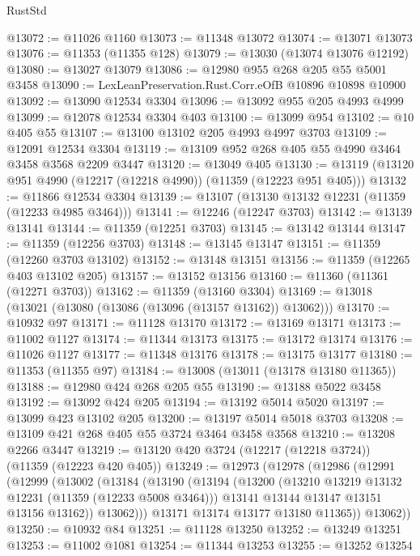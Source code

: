 \begin{lexlean}{RustStd}
\begin{coremodule}
{{{{{{{{{{{{{{{{{{{@13072 := @11026 @1160
@13073 := @11348 @13072
@13074 := @13071 @13073
@13076 := @11353 (@11355 @128)
@13079 := @13030 (@13074 @13076 @12192)
@13080 := @13027 @13079
@13086 := @12980 @955 @268 @205 @55 @5001 @3458
@13090 := LexLeanPreservation.Rust.Corr.eOfB @10896 @10898 @10900
@13092 := @13090 @12534 @3304
@13096 := @13092 @955 @205 @4993 @4999
@13099 := @12078 @12534 @3304 @403
@13100 := @13099 @954
@13102 := @10 @405 @55
@13107 := @13100 @13102 @205 @4993 @4997 @3703
@13109 := @12091 @12534 @3304
@13119 := @13109 @952 @268 @405 @55 @4990 @3464 @3458 @3568 @2209 @3447
@13120 := @13049 @405
@13130 := @13119 (@13120 @951 @4990 (@12217 (@12218 @4990)) (@11359 (@12223 @951 @405)))
@13132 := @11866 @12534 @3304
@13139 := @13107 (@13130 @13132 @12231 (@11359 (@12233 @4985 @3464)))
@13141 := @12246 (@12247 @3703)
@13142 := @13139 @13141
@13144 := @11359 (@12251 @3703)
@13145 := @13142 @13144
@13147 := @11359 (@12256 @3703)
@13148 := @13145 @13147
@13151 := @11359 (@12260 @3703 @13102)
@13152 := @13148 @13151
@13156 := @11359 (@12265 @403 @13102 @205)
@13157 := @13152 @13156
@13160 := @11360 (@11361 (@12271 @3703))
@13162 := @11359 (@13160 @3304)
@13169 := @13018 (@13021 (@13080 (@13086 (@13096 (@13157 @13162)) @13062)))
@13170 := @10932 @97
@13171 := @11128 @13170
@13172 := @13169 @13171
@13173 := @11002 @1127
@13174 := @11344 @13173
@13175 := @13172 @13174
@13176 := @11026 @1127
@13177 := @11348 @13176
@13178 := @13175 @13177
@13180 := @11353 (@11355 @97)
@13184 := @13008 (@13011 (@13178 @13180 @11365))
@13188 := @12980 @424 @268 @205 @55
@13190 := @13188 @5022 @3458
@13192 := @13092 @424 @205
@13194 := @13192 @5014 @5020
@13197 := @13099 @423 @13102 @205
@13200 := @13197 @5014 @5018 @3703
@13208 := @13109 @421 @268 @405 @55 @3724 @3464 @3458 @3568
@13210 := @13208 @2266 @3447
@13219 := @13120 @420 @3724 (@12217 (@12218 @3724)) (@11359 (@12223 @420 @405))
@13249 := @12973
    (@12978
      (@12986
        (@12991
          (@12999
            (@13002
              (@13184
                (@13190
                  (@13194
                    (@13200
                      (@13210 @13219 @13132 @12231 (@11359 (@12233 @5008 @3464)))
                      @13141
                      @13144
                      @13147
                      @13151
                      @13156
                      @13162))
                  @13062)))
            @13171
            @13174
            @13177
            @13180
            @11365))
        @13062))
@13250 := @10932 @84
@13251 := @11128 @13250
@13252 := @13249 @13251
@13253 := @11002 @1081
@13254 := @11344 @13253
@13255 := @13252 @13254
}}}}}}}}}}}}}}}}}}}
\end{coremodule}
\end{lexlean}
